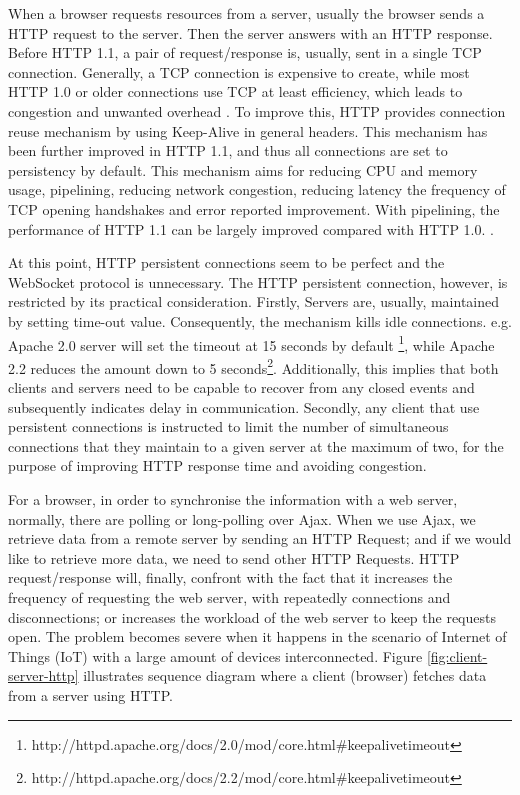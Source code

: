 When a browser requests resources from a server, usually the browser sends a HTTP request to the server. Then the server answers with an HTTP response. Before HTTP 1.1, a pair of request/response is, usually, sent in a single TCP connection. Generally, a TCP connection is expensive to create, while most HTTP 1.0 or older connections use TCP at least efficiency, which leads to congestion and unwanted overhead \cite{spero1994analysis}.  To improve this, HTTP provides connection reuse mechanism \cite{fieldingrfc} by using Keep-Alive in general headers. This mechanism has been further improved in HTTP 1.1, and thus all connections are set to persistency by default. This mechanism aims for reducing CPU and memory usage, pipelining, reducing network congestion, reducing latency the frequency of TCP opening handshakes and error reported improvement. With pipelining, the performance of HTTP 1.1 can be largely improved compared with HTTP 1.0. \cite{nielsen1997network}. 

At this point, HTTP persistent connections seem to be perfect and the WebSocket protocol is unnecessary. The HTTP persistent connection, however, is restricted by its practical consideration. Firstly, Servers are, usually, maintained by setting time-out value. Consequently, the mechanism kills idle connections. e.g. Apache 2.0 server will set the timeout at 15 seconds by default \footnote{http://httpd.apache.org/docs/2.0/mod/core.html\#keepalivetimeout}, while Apache 2.2 reduces the amount down to 5 seconds\footnote{http://httpd.apache.org/docs/2.2/mod/core.html\#keepalivetimeout}. Additionally, this implies that both clients and servers need to be capable to recover from any closed events and subsequently indicates delay in communication. Secondly, any client that use persistent connections is instructed to limit the number of simultaneous connections that they maintain to a given server at the maximum of two, for the purpose of improving HTTP response time and avoiding congestion. 

For a browser, in order to synchronise the information with a web server, normally, there are polling or long-polling over Ajax. When we use Ajax, we retrieve data from a remote server by sending an HTTP Request; and if we would like to retrieve more data, we need to send other HTTP Requests. HTTP request/response will, finally, confront with the fact that it increases the frequency of requesting the web server, with repeatedly connections and disconnections; or increases the workload of the web server to keep the requests open. The problem becomes severe when it happens in the scenario of Internet of Things (IoT) with a large amount of devices interconnected. Figure \ref{fig:client-server-http} illustrates sequence diagram where a client (browser) fetches data from a server using HTTP.


